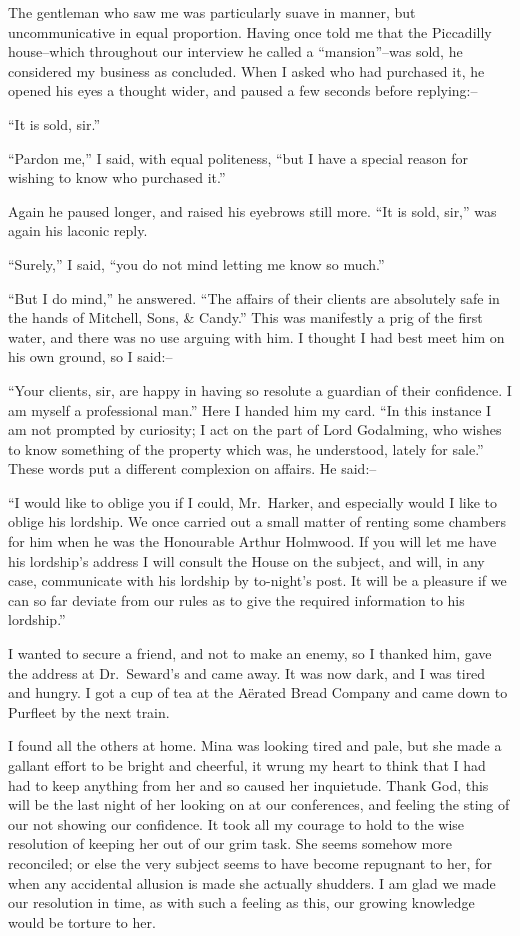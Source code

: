 \documentclass[12pt,openright]{book}
\begin{document}
The gentleman who saw me was particularly suave in manner, but uncommunicative in equal proportion. Having once told me that the Piccadilly house–which throughout our interview he called a “mansion”–was sold, he considered my business as concluded. When I asked who had purchased it, he opened his eyes a thought wider, and paused a few seconds before replying:–

“It is sold, sir.”

“Pardon me,” I said, with equal politeness, “but I have a special reason for wishing to know who purchased it.”

Again he paused longer, and raised his eyebrows still more. “It is sold, sir,” was again his laconic reply.

“Surely,” I said, “you do not mind letting me know so much.”

“But I do mind,” he answered. “The affairs of their clients are absolutely safe in the hands of Mitchell, Sons, \& Candy.” This was manifestly a prig of the first water, and there was no use arguing with him. I thought I had best meet him on his own ground, so I said:–

“Your clients, sir, are happy in having so resolute a guardian of their confidence. I am myself a professional man.” Here I handed him my card. “In this instance I am not prompted by curiosity; I act on the part of Lord Godalming, who wishes to know something of the property which was, he understood, lately for sale.” These words put a different complexion on affairs. He said:–

“I would like to oblige you if I could, Mr. Harker, and especially would I like to oblige his lordship. We once carried out a small matter of renting some chambers for him when he was the Honourable Arthur Holmwood. If you will let me have his lordship’s address I will consult the House on the subject, and will, in any case, communicate with his lordship by to-night’s post. It will be a pleasure if we can so far deviate from our rules as to give the required information to his lordship.”

I wanted to secure a friend, and not to make an enemy, so I thanked him, gave the address at Dr. Seward’s and came away. It was now dark, and I was tired and hungry. I got a cup of tea at the Aërated Bread Company and came down to Purfleet by the next train.

I found all the others at home. Mina was looking tired and pale, but she made a gallant effort to be bright and cheerful, it wrung my heart to think that I had had to keep anything from her and so caused her inquietude. Thank God, this will be the last night of her looking on at our conferences, and feeling the sting of our not showing our confidence. It took all my courage to hold to the wise resolution of keeping her out of our grim task. She seems somehow more reconciled; or else the very subject seems to have become repugnant to her, for when any accidental allusion is made she actually shudders. I am glad we made our resolution in time, as with such a feeling as this, our growing knowledge would be torture to her.
\end{document}

